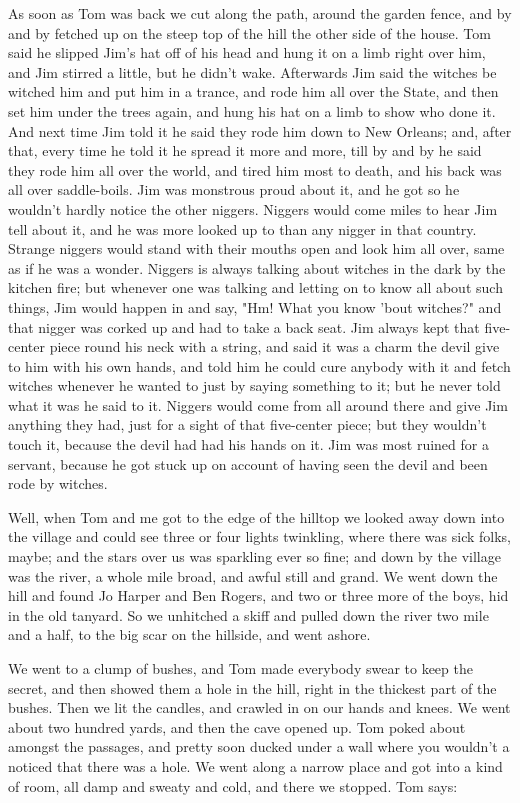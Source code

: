 As soon as Tom was back we cut along the path, around the garden fence,
and by and by fetched up on the steep top of the hill the other side of
the house.  Tom said he slipped Jim's hat off of his head and hung it on
a limb right over him, and Jim stirred a little, but he didn't wake.
Afterwards Jim said the witches be witched him and put him in a trance,
and rode him all over the State, and then set him under the trees again,
and hung his hat on a limb to show who done it.  And next time Jim told
it he said they rode him down to New Orleans; and, after that, every time
he told it he spread it more and more, till by and by he said they rode
him all over the world, and tired him most to death, and his back was all
over saddle-boils.  Jim was monstrous proud about it, and he got so he
wouldn't hardly notice the other niggers.  Niggers would come miles to
hear Jim tell about it, and he was more looked up to than any nigger in
that country.  Strange niggers would stand with their mouths open and
look him all over, same as if he was a wonder.  Niggers is always talking
about witches in the dark by the kitchen fire; but whenever one was
talking and letting on to know all about such things, Jim would happen in
and say, "Hm!  What you know 'bout witches?" and that nigger was corked
up and had to take a back seat.  Jim always kept that five-center piece
round his neck with a string, and said it was a charm the devil give to
him with his own hands, and told him he could cure anybody with it and
fetch witches whenever he wanted to just by saying something to it; but
he never told what it was he said to it.  Niggers would come from all
around there and give Jim anything they had, just for a sight of that
five-center piece; but they wouldn't touch it, because the devil had had
his hands on it.  Jim was most ruined for a servant, because he got stuck
up on account of having seen the devil and been rode by witches.

Well, when Tom and me got to the edge of the hilltop we looked away down
into the village and could see three or four lights twinkling, where
there was sick folks, maybe; and the stars over us was sparkling ever so
fine; and down by the village was the river, a whole mile broad, and
awful still and grand.  We went down the hill and found Jo Harper and Ben
Rogers, and two or three more of the boys, hid in the old tanyard.  So we
unhitched a skiff and pulled down the river two mile and a half, to the
big scar on the hillside, and went ashore.

We went to a clump of bushes, and Tom made everybody swear to keep the
secret, and then showed them a hole in the hill, right in the thickest
part of the bushes.  Then we lit the candles, and crawled in on our hands
and knees.  We went about two hundred yards, and then the cave opened up.
Tom poked about amongst the passages, and pretty soon ducked under a wall
where you wouldn't a noticed that there was a hole.  We went along a
narrow place and got into a kind of room, all damp and sweaty and cold,
and there we stopped.  Tom says:

